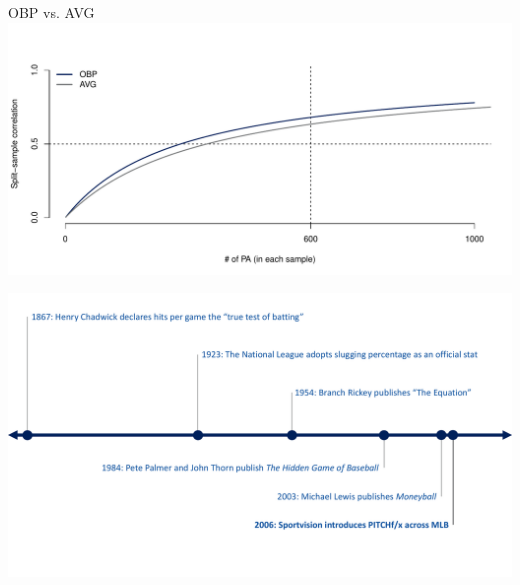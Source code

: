\documentclass[handout]{beamer}
\begin{document}
\begin{frame}{OBP vs. AVG}
  \includegraphics[width = \textwidth]{figures/avg_obp.pdf}
\end{frame}

\begin{frame}
  \includegraphics[width = \textwidth]{figures/timeline_2006.pdf}
\end{frame}
\end{document}
